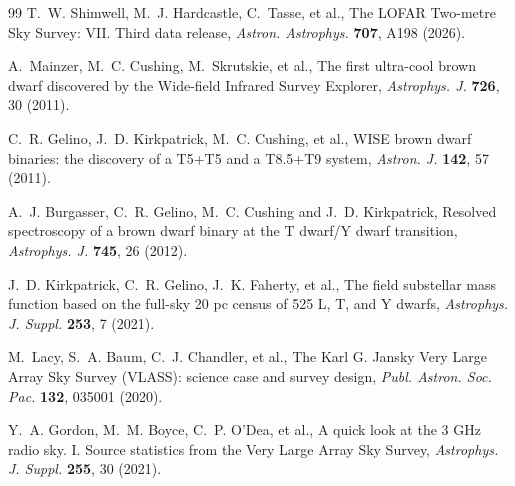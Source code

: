 \documentclass[3p,11pt]{elsarticle}
\begin{document}
\begin{thebibliography}{99}
T.~W. Shimwell, M.~J. Hardcastle, C.~Tasse, et al., The LOFAR Two-metre Sky Survey: VII.
Third data release, \emph{Astron. Astrophys.} \textbf{707}, A198 (2026).

A.~Mainzer, M.~C. Cushing, M.~Skrutskie, et al., The first ultra-cool brown dwarf
discovered by the Wide-field Infrared Survey Explorer, \emph{Astrophys. J.} \textbf{726},
30 (2011).

C.~R. Gelino, J.~D. Kirkpatrick, M.~C. Cushing, et al., WISE brown dwarf binaries: the
discovery of a T5+T5 and a T8.5+T9 system, \emph{Astron. J.} \textbf{142}, 57 (2011).

A.~J. Burgasser, C.~R. Gelino, M.~C. Cushing and J.~D. Kirkpatrick, Resolved
spectroscopy of a brown dwarf binary at the T dwarf/Y dwarf transition,
\emph{Astrophys. J.} \textbf{745}, 26 (2012).

J.~D. Kirkpatrick, C.~R. Gelino, J.~K. Faherty, et al., The field substellar mass
function based on the full-sky 20 pc census of 525 L, T, and Y dwarfs,
\emph{Astrophys. J. Suppl.} \textbf{253}, 7 (2021).

M.~Lacy, S.~A. Baum, C.~J. Chandler, et al., The Karl G. Jansky Very Large Array Sky
Survey (VLASS): science case and survey design, \emph{Publ. Astron. Soc. Pac.}
\textbf{132}, 035001 (2020).

Y.~A. Gordon, M.~M. Boyce, C.~P. O'Dea, et al., A quick look at the 3 GHz radio sky. I.
Source statistics from the Very Large Array Sky Survey, \emph{Astrophys. J. Suppl.}
\textbf{255}, 30 (2021).

\end{thebibliography}
\end{document}
